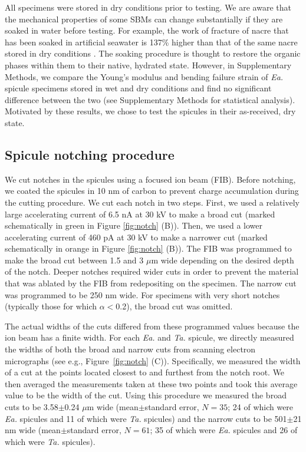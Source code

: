\documentclass[12pt,onecolumn]{article}
\makeatletter
\newcommand{\TA}{\textit{Ta.\@}\xspace}
\newcommand{\EA}{\textit{Ea.\@}\xspace}
\makeatother
\begin{document}
\begin{bibunit}
All specimens were stored in dry conditions prior to testing. We are aware that the mechanical properties of some SBMs can change substantially if they are soaked in water before testing. For example, the work of fracture of nacre that has been soaked in artificial seawater is 137\% higher than that of the same nacre stored in dry conditions \cite{jackson1988}. The soaking procedure is thought to restore the organic phases within them to their native, hydrated state.  However, in Supplementary Methods, we compare the Young's modulus and bending failure strain of \EA spicule specimens stored in wet and dry conditions and find no significant difference between the two (see Supplementary Methods for statistical analysis). Motivated by these results, we chose to test the spicules in their as-received, dry state.

\subsection*{Spicule notching procedure}
\label{sec:notchconfig}
We cut notches in the spicules using a focused ion beam (FIB). Before notching, we coated the spicules in 10 nm of carbon to prevent charge accumulation during the cutting procedure. We cut each notch in two steps. First, we used a relatively large accelerating current of 6.5 nA at 30 kV to make a broad cut (marked schematically in green in Figure \ref{fig:notch} (B)). Then, we used a lower accelerating current of 460 pA at 30 kV to make a narrower cut (marked schematically in orange in Figure \ref{fig:notch} (B)). The FIB was programmed to make the broad cut between 1.5 and 3 $\mu$m wide depending on the desired depth of the notch. Deeper notches required wider cuts in order to prevent the material that was ablated by the FIB from redepositing on the specimen. The narrow cut was programmed to be 250 nm wide. For specimens with very short notches (typically those for which $\alpha<$0.2), the broad cut was omitted.

The actual widths of the cuts differed from these programmed values because the ion beam has a finite width. For each \EA and \TA spicule, we directly measured the widths of both the broad and narrow cuts from scanning electron micrographs (see e.g., Figure~\ref{fig:notch} (C)). Specifically, we measured the width of a cut at the points located closest to and furthest from the notch root. We then averaged the measurements taken at these two points and took this average value to be the width of the cut. Using this procedure we measured the broad cuts to be 3.58$\pm$0.24 $\mu$m wide (mean$\pm$standard error, $N=35$; 24 of which were \EA spicules and 11 of which were \TA spicules) and the narrow cuts to be 501$\pm$21 nm wide (mean$\pm$standard error, $N=61$; 35 of which were \EA spicules and 26 of which were \TA spicules).


\end{bibunit}
\end{document}
